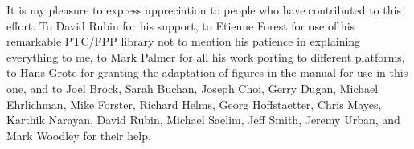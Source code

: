 It is my pleasure to express appreciation to people who have
contributed to this effort: To David Rubin for his support, to Etienne
Forest for use of his remarkable PTC/FPP library not to mention his
patience in explaining everything to me, to Mark Palmer for all his
work porting \bmad to different platforms, to Hans Grote for granting
the adaptation of figures in the \mad manual for use in this one, and
to Joel Brock, Sarah Buchan, Joseph Choi, Gerry Dugan, Michael
Ehrlichman, Mike Forster, Richard Helms, Georg Hoffstaetter, Chris
Mayes, Karthik Narayan, David Rubin, Michael Saelim, Jeff Smith,
Jeremy Urban, and Mark Woodley for their help.

